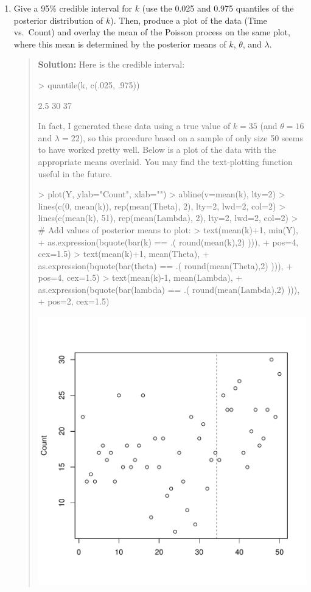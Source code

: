 \documentclass{article}
\begin{document}
\begin{enumerate}
\begin{enumerate}
    \item Give a 95\% credible interval for $k$ (use the 0.025 and 0.975
    quantiles of the posterior distribution of $k$). Then, produce a plot of the
    data (Time vs.~Count) and overlay the mean of the Poisson process on the
    same plot, where this mean is determined by the posterior means of $k$,
    $\theta$, and $\lambda$.
    \begin{quotation}{\bf Solution:}
    Here is the credible interval:
\begin{Schunk}
\begin{Sinput}
> quantile(k, c(.025, .975))
\end{Sinput}
\begin{Soutput}
 2.5%
   30    37 
\end{Soutput}
\end{Schunk}
    In fact, I generated these data using a true value of $k=35$ (and 
    $\theta=16$ and $\lambda=22$), so this procedure 
    based on a sample of only size 50 seems to have worked pretty well.
    Below is a plot of the data with the appropriate means overlaid.
    You may find the text-plotting function useful in the future.
\begin{Schunk}
\begin{Sinput}
> plot(Y, ylab="Count", xlab="")
> abline(v=mean(k), lty=2)
> lines(c(0, mean(k)), rep(mean(Theta), 2), lty=2, lwd=2, col=2)
> lines(c(mean(k), 51), rep(mean(Lambda), 2), lty=2, lwd=2, col=2)
> # Add values of posterior means to plot:
> text(mean(k)+1, min(Y), 
+      as.expression(bquote(bar(k) == .( round(mean(k),2)  ))), 
+      pos=4, cex=1.5)
> text(mean(k)+1, mean(Theta), 
+      as.expression(bquote(bar(theta) == .( round(mean(Theta),2)  ))), 
+      pos=4, cex=1.5)
> text(mean(k)-1, mean(Lambda), 
+      as.expression(bquote(bar(lambda) == .( round(mean(Lambda),2)  ))), 
+      pos=2, cex=1.5)
\end{Sinput}
\end{Schunk}
\includegraphics{sol11-009}

\end{quotation}
\end{enumerate}
\end{enumerate}
\end{document}
